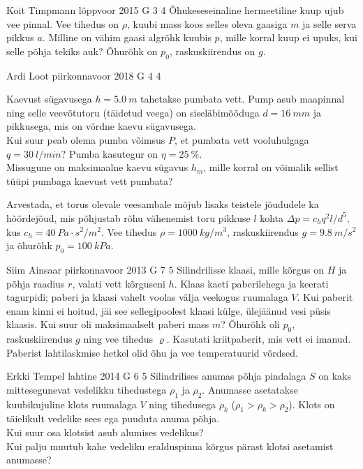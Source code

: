 \documentclass[11pt]{article}
\begin{document}
{%
{Koit Timpmann} %
{lõppvoor} %
{2015} %
{G 3} %
{4} %
{
\ifStatement
Õhukeseseinaline hermeetiline kuup ujub vee pinnal. Vee tihedus on $\rho$, kuubi mass koos selles oleva gaasiga $m$ ja selle serva pikkus $a$. Milline on vähim gaasi algrõhk kuubis $p$, mille korral kuup ei upuks, kui selle põhja tekiks auk? Õhurõhk on $p_0$, raskuskiirendus on $g$.
\fi
}

{Ardi Loot} %
{piirkonnavoor} %
{2018} %
{G 4} %
{4} %
{
\ifStatement
Kaevust sügavusega $h=\SI{5.0}{m}$ tahetakse pumbata vett. Pump asub
maapinnal ning selle veevõtutoru (täidetud veega) on siseläbimõõduga
$d=\SI{16}{mm}$ ja pikkusega, mis on võrdne kaevu sügavusega.\\
\osa Kui suur peab olema pumba võimsus $P$, et pumbata vett vooluhulgaga
$q=\SI{30}{l/min}$? Pumba kasutegur on $\eta=\SI{25}{\percent}$.\\
\osa Missugune on maksimaalne kaevu sügavus $h_{m}$, mille korral on
võimalik sellist tüüpi pumbaga kaevust vett pumbata?

Arvestada, et torus olevale veesambale mõjub lisaks teistele jõududele
ka hõõrdejõud, mis põhjustab rõhu vähenemist toru pikkuse $l$ kohta $\Delta p=c_{h}q^{2}l/d^{5},$
kus $c_{h}=\SI{40}{Pa\cdot s^{2}/m^{2}}.$ Vee tihedus $\rho=\SI{1000}{kg/m^{3}}$,
raskuskiirendus $g=\SI{9.8}{m/s^{2}}$ ja õhurõhk $p_{0}=\SI{100}{kPa}.$
\fi
}

{Siim Ainsaar} %
{piirkonnavoor} %
{2013} %
{G 7} %
{5} %
{
\ifStatement
Silindrilisse klaasi, mille kõrgus on $H$ ja põhja raadius $r$, valati
vett kõrguseni $h$. Klaas kaeti paberilehega ja keerati
tagurpidi; paberi ja
klaasi vahelt voolas välja veekogus ruumalaga $V$. Kui paberit enam kinni ei
hoitud, jäi see sellegipoolest klaasi külge, ülejäänud vesi püsis klaasis.
Kui suur oli maksimaalselt paberi mass $m$? Õhurõhk oli $p_0$,
raskuskiirendus $g$ ning vee tihedus $\varrho$.
Kasutati kriitpaberit, mis vett ei imanud. Paberist lahtilaskmise hetkel olid 
õhu ja vee temperatuurid võrdsed.
\fi
}

{Erkki Tempel} %
{lahtine} %
{2014} %
{G 6} %
{5} %
{
\ifStatement
Silindrilises anumas põhja pindalaga $S$ on kaks mittesegunevat vedelikku tihedustega $\rho_1$ ja $\rho_2$. Anumasse asetatakse kuubikujuline klots ruumalaga $V$ ning tihedusega $\rho_k$ ($\rho_1>\rho_k>\rho_2$). Klots on täielikult vedelike sees ega puuduta anuma põhja.\\
\osa Kui suur osa klotsist asub alumises vedelikus?\\
\osa Kui palju muutub kahe vedeliku eralduspinna kõrgus pärast klotsi asetamist anumasse?
\fi
}

}
\end{document}
